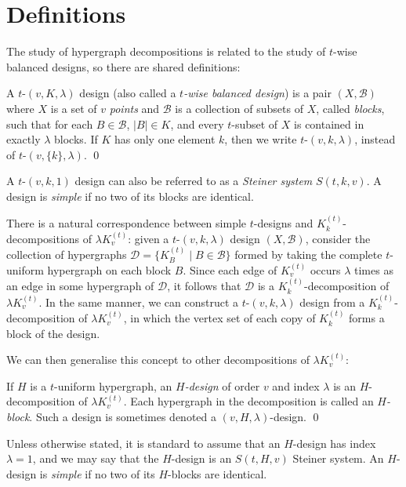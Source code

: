 \section{Definitions}

The study of hypergraph decompositions is related to the study of $t$-wise balanced designs, so there are shared definitions:

\begin{definition}
A $t$-$(v,K,\lambda)$ design (also called a {\em $t$-wise balanced design}) is a pair $(X, \mathcal{B})$ where $X$ is a set of $v$ {\em points} and $\mathcal{B}$ is a collection of subsets of $X$, called {\em blocks}, such that for each $B \in \mathcal{B}$, $|B| \in K$, and every $t$-subset of $X$ is contained in exactly $\lambda$ blocks.
If $K$ has only one element $k$, then we write $t$-$(v, k, \lambda)$, instead of $t$-$(v,\{k\},\lambda)$.
\qed
\end{definition}

A $t$-$(v, k, 1)$ design can also be referred to as a {\em Steiner system} $S(t, k, v)$.
A design is {\em simple} if no two of its blocks are identical.

There is a natural correspondence between simple $t$-designs and $K_{k}^{(t)}$-decompositions of $\lambda K_{v}^{(t)}$: given a $t$-$(v, k, \lambda)$ design $(X, \mathcal{B})$, consider the collection of hypergraphs $\mathcal{D} = \{K_{B}^{(t)} \mid B \in \mathcal{B}\}$ formed by taking the complete $t$-uniform hypergraph on each block $B$.
Since each edge of $K_v^{(t)}$ occurs $\lambda$ times as an edge in some hypergraph of $\mathcal{D}$, it follows that $\mathcal{D}$ is a $K_{k}^{(t)}$-decomposition of $\lambda K_{v}^{(t)}$.
In the same manner, we can construct a $t$-$(v, k, \lambda)$ design from a $K_{k}^{(t)}$-decomposition of $\lambda K_{v}^{(t)}$, in which the vertex set of each copy of $K_k^{(t)}$ forms a block of the design.

We can then generalise this concept to other decompositions of $\lambda K_{v}^{(t)}$:

\begin{definition}
If $H$ is a $t$-uniform hypergraph, an {\em $H$-design} of order $v$ and index $\lambda$ is an $H$-decomposition of $\lambda K_{v}^{(t)}$.
Each hypergraph in the decomposition is called an {\em $H$-block}.
Such a design is sometimes denoted a $(v, H, \lambda)$-design.
\qed
\end{definition}

Unless otherwise stated, it is standard to assume that an $H$-design has index $\lambda = 1$, and we may say that the $H$-design is an $S(t, H, v)$ Steiner system.
An $H$-design is {\em simple} if no two of its $H$-blocks are identical.

